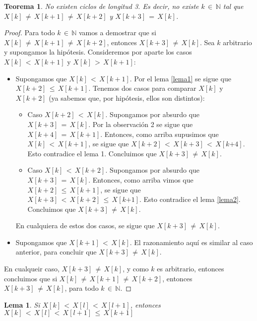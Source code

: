 \documentclass{article}
\newtheorem{teor}{Teorema}
\newtheorem{lema}{Lema}
\begin{document}
\begin{teor}
No existen ciclos de longitud 3. Es decir, no existe $k\,{\in}\,\mathbb{N}$ tal que $X[k]\,{\neq}\, X[k{+}1]\,{\neq}\, X[k{+}2]$ y $X[k{+}3]\,{=}\,X[k]$. 
\end{teor}
\begin{proof}
Para todo $k\,{\in}\,\mathbb{N}$ vamos a demostrar que si $X[k]\,{\neq}\, X[k{+}1]\,{\neq}\, X[k{+}2]$, entonces $X[k{+}3]\,{\neq}\,X[k]$. Sea $k$ arbitrario y supongamos la hipótesis. Consideremos por aparte los casos $X[k]\,{<}\, X[k{+}1]$ y $X[k]\,{>}\, X[k{+}1]$:
%
\begin{itemize}
\item Supongamos que $X[k]\,{<}\, X[k{+}1]$. Por el lema \ref{lema1} se sigue que $X[k{+}2]\,{\leq}\, X[k{+}1]$. Tenemos dos casos para comparar $X[k]$ y $X[k{+}2]$ (ya sabemos que, por hipótesis, ellos son distintos):
	\begin{itemize}
	\item Caso $X[k{+}2]\,{<}\,X[k]$. Supongamos por absurdo que $X[k{+}3]\,{=}\,X[k]$. Por la observación 2 se sigue que $X[k{+}4]\,{=}\,X[k{+}1]$. Entonces, como arriba supusimos que $X[k]\,{<}\, X[k{+}1]$, se sigue que $X[k{+}2]\,{<}\,X[k{+}3]\,{<}\,X[k{+4}]$. Esto contradice el lema 1. Concluimos que $X[k{+}3]\,{\neq}\,X[k]$.
	\item Caso $X[k]\,{<}\,X[k{+}2]$. Supongamos por absurdo que $X[k{+}3]\,{=}\,X[k]$. Entonces, como arriba vimos que $X[k{+}2]\,{\leq}\, X[k{+}1]$, se sigue que $X[k{+}3]\,{<}\,X[k{+}2]\,{\leq}\,X[k{+1}]$. Esto contradice el lema \ref{lema2}. Concluimos que $X[k{+}3]\,{\neq}\,X[k]$.
	\end{itemize}
	En cualquiera de estos dos casos, se sigue que $X[k{+}3]\,{\neq}\,X[k]$.

\item Supongamos que $X[k{+}1]\,{<}\, X[k]$. El razonamiento aquí es similar al caso anterior, para concluir que $X[k{+}3]\,{\neq}\,X[k]$.
\end{itemize}
En cualqueir caso, $X[k{+}3]\,{\neq}\,X[k]$, y como $k$ es arbitrario, entonces concluimos que si $X[k]\,{\neq}\, X[k{+}1]\,{\neq}\, X[k{+}2]$, entonces $X[k{+}3]\,{\neq}\,X[k]$, para todo $k\,{\in}\,\mathbb{N}$.
\end{proof}

\begin{lema}\label{lema3}
Si $X[k]\,{<}\,X[l]\,{<}\,X[l{+}1]$, entonces $X[k]\,{<}\,X[l]\,{<}\,X[l{+}1]\,{\leq}\,X[k{+}1]$
\end{lema}
\end{document}
